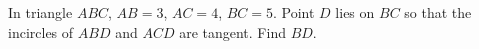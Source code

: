 In triangle $ABC$, $AB=3$, $AC=4$, $BC=5$. Point $D$ lies on $BC$ so that the incircles of $ABD$ and $ACD$ are tangent. Find $BD$.
